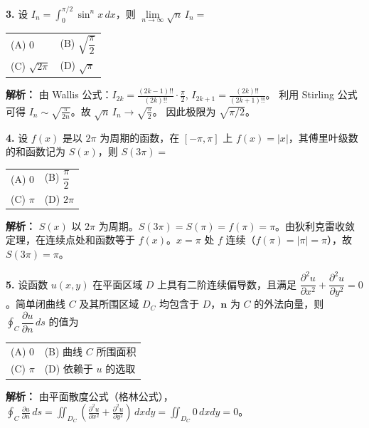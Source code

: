 \textbf{3.} 设 $I_n = \displaystyle\int_{0}^{\pi/2} \sin^n x\,dx$，则 $\lim\limits_{n\to\infty}\sqrt{n}\,I_n =$
\begin{center}
\begin{tabular}{ll}
(A) $0$ & (B) $\sqrt{\dfrac{\pi}{2}}$ \\[6pt]
(C) $\sqrt{2\pi}$ & (D) $\sqrt{\pi}$
\end{tabular}
\end{center}

\ifshowsolutions\par\noindent\textbf{解析：} 由 Wallis 公式：$I_{2k}=\frac{(2k-1)!!}{(2k)!!}\cdot\frac{\pi}{2}$, $I_{2k+1}=\frac{(2k)!!}{(2k+1)!!}$。
利用 Stirling 公式可得 $I_n\sim\sqrt{\frac{\pi}{2n}}$。故 $\sqrt{n}\,I_n\to\sqrt{\frac{\pi}{2}}$。
因此极限为 $\sqrt{\pi/2}$。\else \answerarea \fi

\vspace{8pt}

\textbf{4.} 设 $f(x)$ 是以 $2\pi$ 为周期的函数，在 $[-\pi,\pi]$ 上 $f(x)=|x|$，其傅里叶级数的和函数记为 $S(x)$，则 $S(3\pi)=$
\begin{center}
\begin{tabular}{ll}
(A) $0$ & (B) $\dfrac{\pi}{2}$ \\[6pt]
(C) $\pi$ & (D) $2\pi$
\end{tabular}
\end{center}

\ifshowsolutions\par\noindent\textbf{解析：} $S(x)$ 以 $2\pi$ 为周期。$S(3\pi)=S(\pi)=f(\pi)=\pi$。由狄利克雷收敛定理，在连续点处和函数等于 $f(x)$。$x=\pi$ 处 $f$ 连续（$f(\pi)=|\pi|=\pi$），故 $S(3\pi)=\pi$。\else \answerarea \fi

\vspace{8pt}

\textbf{5.} 设函数 $u(x,y)$ 在平面区域 $D$ 上具有二阶连续偏导数，且满足 $\dfrac{\partial^2 u}{\partial x^2}+\dfrac{\partial^2 u}{\partial y^2}=0$。简单闭曲线 $C$ 及其所围区域 $D_C$ 均包含于 $D$，$\boldsymbol n$ 为 $C$ 的外法向量，则 $\displaystyle\oint_{C}\dfrac{\partial u}{\partial n}\,ds$ 的值为
\begin{center}
\begin{tabular}{ll}
(A) $0$ & (B) 曲线 $C$ 所围面积 \\[4pt]
(C) $\pi$ & (D) 依赖于 $u$ 的选取
\end{tabular}
\end{center}

\ifshowsolutions\par\noindent\textbf{解析：} 由平面散度公式（格林公式），$\oint_C\frac{\partial u}{\partial n}\,ds = \iint_{D_C} (\frac{\partial^2 u}{\partial x^2}+\frac{\partial^2 u}{\partial y^2})\,dxdy = \iint_{D_C} 0\,dxdy = 0$。\else \answerarea \fi

